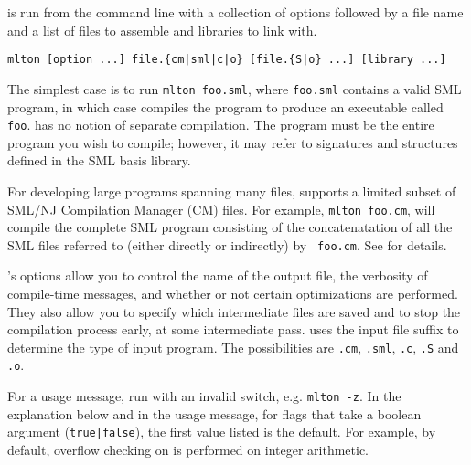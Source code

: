 
{\mlton} is run from the command line with a collection of options followed by a
file name and a list of files to assemble and libraries to link with.
\begin{verbatim}
mlton [option ...] file.{cm|sml|c|o} [file.{S|o} ...] [library ...]
\end{verbatim}
The simplest case is to run {\tt mlton foo.sml}, where {\tt foo.sml} contains a
valid SML program, in which case {\mlton} compiles the program to produce an
executable called {\tt foo}.  {\mlton} has no notion of separate compilation.
The program must be the entire program you wish to compile; however, it may
refer to signatures and structures defined in the SML basis library.

For developing large programs spanning many files, {\mlton} supports a limited
subset of SML/NJ Compilation Manager (CM) files.  For example, {\tt mlton
foo.cm}, will compile the complete SML program consisting of the concatenatation
of all the SML files referred to (either directly or indirectly) by {\tt
foo.cm}.  See  for details.


{\mlton}'s options allow you to control the name of the output file, the
verbosity of compile-time messages, and whether or not certain optimizations are
performed.  They also allow you to specify which intermediate files are saved
and to stop the compilation process early, at some intermediate pass.  {\mlton}
uses the input file suffix to determine the type of input program.  The
possibilities are {\tt .cm}, {\tt .sml}, {\tt .c}, {\tt .S} and {\tt .o}.

For a usage message, run {\mlton} with an invalid switch, e.g. {\tt mlton -z}.
In the explanation below and in the usage message, for flags that take a boolean
argument ({\tt {true|false}}), the first value listed is the default.  For
example, by default, overflow checking on is performed on integer arithmetic.

\newcommand{\option}[1]{\item[{\tt #1}]\hspace{1em}\\}

